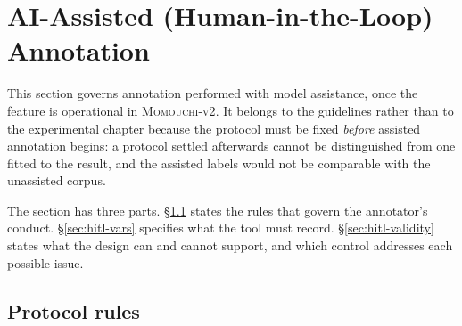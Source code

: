 \section{AI-Assisted (Human-in-the-Loop) Annotation}
\label{sec:hitl}

This section governs annotation performed with model assistance, once the feature is operational in \textsc{Momouchi-v2}. It belongs to the guidelines rather than to the experimental chapter because the protocol must be fixed \emph{before} assisted annotation begins: a protocol settled afterwards cannot be distinguished from one fitted to the result, and the assisted labels would not be comparable with the unassisted corpus.

\noindent The section has three parts. \S\ref{sec:hitl-rules} states the rules that govern the annotator's conduct. \S\ref{sec:hitl-vars} specifies what the tool must record. \S\ref{sec:hitl-validity} states what the design can and cannot support, and which control addresses each possible issue.

\subsection{Protocol rules}
\label{sec:hitl-rules}

